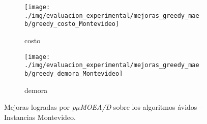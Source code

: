 \begin{figure}[!htpb]
\centering
\begin{subfigure}{.5\textwidth}
  \centering
  \texttt{[image: ./img/evaluacion\_experimental/mejoras\_greedy\_maeb/greedy\_costo\_Montevideo]}
  \caption{costo}
  \label{fig:mejoras_greedy_costo_maeb_montevideo}
\end{subfigure}%
\begin{subfigure}{.5\textwidth}
  \centering
  \texttt{[image: ./img/evaluacion\_experimental/mejoras\_greedy\_maeb/greedy\_demora\_Montevideo]}
  \caption{demora}
  \label{fig:mejoras_greedy_demora_maeb_montevideo}
\end{subfigure}
\caption{Mejoras logradas por \textit{p$\mu$MOEA/D} sobre los algoritmos ávidos -- Instancias Montevideo.}
\label{fig:mejoras_greedy_maeb_montevideo}
\end{figure}